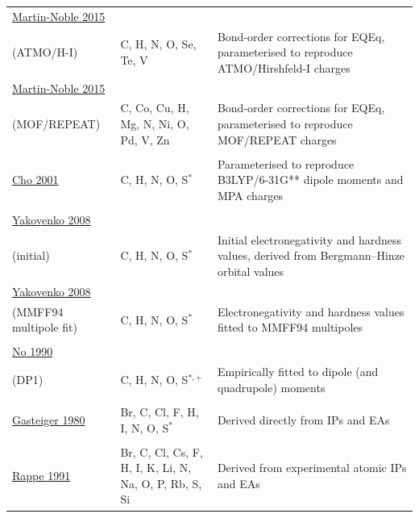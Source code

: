 \documentclass[oneside]{memoir}
\begin{document}
\begin{longtable}{p{4cm} p{3.3cm} p{8cm}}
\addlinespace[5pt] \href{https://doi.org/10.1021/acs.jctc.5b00037}{Martin-Noble 2015}\\(ATMO/H-I) & C, H, N, O, Se, Te, V & Bond-order corrections for EQEq, parameterised to reproduce ATMO/Hirshfeld-I charges \\
\addlinespace[5pt]\midrule\addlinespace[5pt] \href{https://doi.org/10.1021/acs.jctc.5b00037}{Martin-Noble 2015}\\(MOF/REPEAT) & C, Co, Cu, H, Mg, N, Ni, O, Pd, V, Zn & Bond-order corrections for EQEq, parameterised to reproduce MOF/REPEAT charges \\
\addlinespace
\hline\hline
\addlinespace[5pt]\multicolumn{3}{l}{\textbf{GDAC}} \\\addlinespace[5pt]
\addlinespace[5pt] \href{https://doi.org/10.1021/jp0023213}{Cho 2001} & C, H, N, O, S$^{*}$ & Parameterised to reproduce B3LYP/6-31G** dipole moments and MPA charges \\
\addlinespace[5pt]\multicolumn{3}{l}{\textbf{KCM}} \\\addlinespace[5pt]
\addlinespace[5pt] \href{https://doi.org/10.1002/jcc.20892}{Yakovenko 2008}\\(initial) & C, H, N, O, S$^{*}$ & Initial electronegativity and hardness values, derived from Bergmann--Hinze orbital values \\
\addlinespace[5pt] \href{https://doi.org/10.1002/jcc.20892}{Yakovenko 2008}\\(MMFF94 multipole fit) & C, H, N, O, S$^{*}$ & Electronegativity and hardness values fitted to MMFF94 multipoles \\
\addlinespace
\hline\hline
\addlinespace[5pt]\multicolumn{3}{l}{\textbf{MPEOE}} \\\addlinespace[5pt]
\addlinespace[5pt] \href{https://doi.org/10.1021/j100374a066}{No 1990}\\(DP1) & C, H, N, O, S$^{*,+}$ & Empirically fitted to dipole (and quadrupole) moments \\
\addlinespace
\hline\hline
\addlinespace[5pt]\multicolumn{3}{l}{\textbf{PEOE}} \\\addlinespace[5pt]
\addlinespace[5pt] \href{https://doi.org/10.1016/0040-4020(80)80168-2}{Gasteiger 1980} & Br, C, Cl, F, H, I, N, O, S$^{*}$ & Derived directly from IPs and EAs \\
\addlinespace
\hline\hline
\addlinespace[5pt]\multicolumn{3}{l}{\textbf{QEq}} \\\addlinespace[5pt]
\addlinespace[5pt] \href{https://doi.org/10.1021/j100161a070}{Rappe 1991} & Br, C, Cl, Cs, F, H, I, K, Li, N, Na, O, P, Rb, S, Si & Derived from experimental atomic IPs and EAs \\

\end{longtable}
\end{document}
